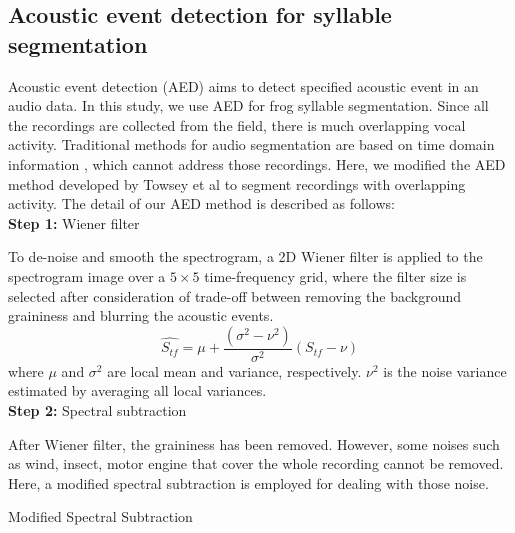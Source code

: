\subsection{Acoustic event detection for syllable segmentation}
Acoustic event detection (AED) aims to detect specified acoustic event in an audio data. In this study, we use AED for frog syllable segmentation. Since all the recordings are collected from the field, there is much overlapping vocal activity. Traditional methods for audio segmentation are based on time domain information \cite{somervuo2004classification,huang2009frog}, which cannot address those recordings. Here, we modified the AED method developed by Towsey et al \cite{towsey2012toolbox} to segment recordings with overlapping activity. The detail of our AED method is described as follows:
\\
\textbf{Step 1:} Wiener filter 

\noindent To de-noise and smooth the spectrogram, a 2D Wiener filter is applied to the spectrogram image over a $5 \times 5$ time-frequency grid, where the filter size is selected after consideration of trade-off between removing the background graininess and blurring the acoustic events.
\begin{equation}
\hat{S_{tf}} = \mu + \frac{(\sigma^{2}-\nu^{2})}{\sigma^{2}}(S_{tf}-\nu)
\end{equation}
where $\mu$ and $\sigma^{2}$ are local mean and variance, respectively. $\nu^{2}$ is the noise variance  estimated by averaging all local variances. 
\\
\textbf{Step 2:} Spectral subtraction

\noindent After Wiener filter, the graininess has been removed. However, some noises such as wind, insect, motor engine that cover the whole recording cannot be removed. Here, a modified spectral subtraction is employed for dealing with those noise. 


\begin{algorithm}
\DontPrintSemicolon
{}

\caption{Modified Spectral Subtraction\label{IR}}

\end{algorithm}

